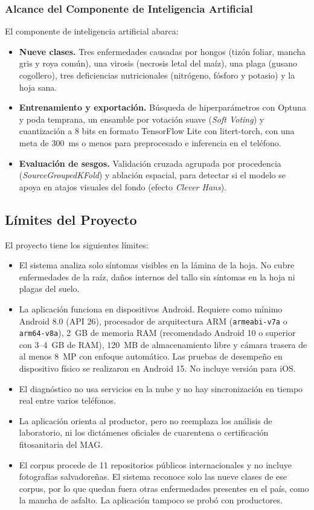 \subsubsection{Alcance del Componente de Inteligencia Artificial}
El componente de inteligencia artificial abarca:
\begin{itemize}
\item \textbf{Nueve clases.} Tres enfermedades causadas por hongos (tiz\'on foliar, mancha gris y roya com\'un), una virosis (necrosis letal del ma\'iz), una plaga (gusano cogollero), tres deficiencias nutricionales (nitr\'ogeno, f\'osforo y potasio) y la hoja sana.
\item \textbf{Entrenamiento y exportaci\'on.} B\'usqueda de hiperpar\'ametros con Optuna y poda temprana, un ensamble por votaci\'on suave (\textit{Soft Voting}) y cuantizaci\'on a 8 bits en formato TensorFlow Lite con litert-torch, con una meta de 300~ms o menos para preprocesado e inferencia en el tel\'efono.
\item \textbf{Evaluaci\'on de sesgos.} Validaci\'on cruzada agrupada por procedencia (\textit{SourceGroupedKFold}) y ablaci\'on espacial, para detectar si el modelo se apoya en atajos visuales del fondo (efecto \textit{Clever Hans}).
\end{itemize}

\subsection{L\'imites del Proyecto}

El proyecto tiene los siguientes l\'imites:
\begin{itemize}
\item El sistema analiza solo s\'intomas visibles en la l\'amina de la hoja. No cubre enfermedades de la ra\'iz, da\~nos internos del tallo sin s\'intomas en la hoja ni plagas del suelo.
\item La aplicaci\'on funciona en dispositivos Android. Requiere como m\'inimo Android 8.0 (API 26), procesador de arquitectura ARM (\texttt{armeabi-v7a} o \texttt{arm64-v8a}), 2~GB de memoria RAM (recomendado Android 10 o superior con 3--4~GB de RAM), 120~MB de almacenamiento libre y c\'amara trasera de al menos 8~MP con enfoque autom\'atico. Las pruebas de desempe\~no en dispositivo f\'isico se realizaron en Android 15. No incluye versi\'on para iOS.
\item El diagn\'ostico no usa servicios en la nube y no hay sincronizaci\'on en tiempo real entre varios tel\'efonos.
\item La aplicaci\'on orienta al productor, pero no reemplaza los an\'alisis de laboratorio, ni los dict\'amenes oficiales de cuarentena o certificaci\'on fitosanitaria del MAG.
\item El corpus procede de 11 repositorios p\'ublicos internacionales y no incluye fotograf\'ias salvadore\~nas. El sistema reconoce solo las nueve clases de ese corpus, por lo que quedan fuera otras enfermedades presentes en el pa\'is, como la mancha de asfalto. La aplicaci\'on tampoco se prob\'o con productores.
\end{itemize}

